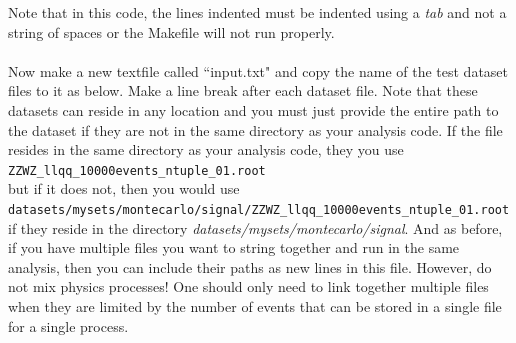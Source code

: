 \documentclass[12pt]{article}
\begin{document}
Note that in this code, the lines indented must be indented using a \textit{tab} and not a string of spaces or the Makefile will not run properly.  \\
\\
Now make a new textfile called ``input.txt" and copy the name of the test dataset files to it as below. Make a line break after each dataset file.  Note that these datasets can reside in any location and you must just provide the entire path to the dataset if they are not in the same directory as your analysis code.  If the file resides in the same directory as your analysis code, they you use \\
\texttt{ZZWZ\_llqq\_10000events\_ntuple\_01.root} \\
but if it does not, then you would use \\ \texttt{datasets/mysets/montecarlo/signal/ZZWZ\_llqq\_10000events\_ntuple\_01.root}\\
if they reside in the directory \textit{datasets/mysets/montecarlo/signal}.  And as before, if you have multiple files you want to string together and run in the same analysis, then you can include their paths as new lines in this file.  However, do not mix physics processes!  One should only need to link together multiple files when they are limited by the number of events that can be stored in a single file for a single process.
\end{document}
